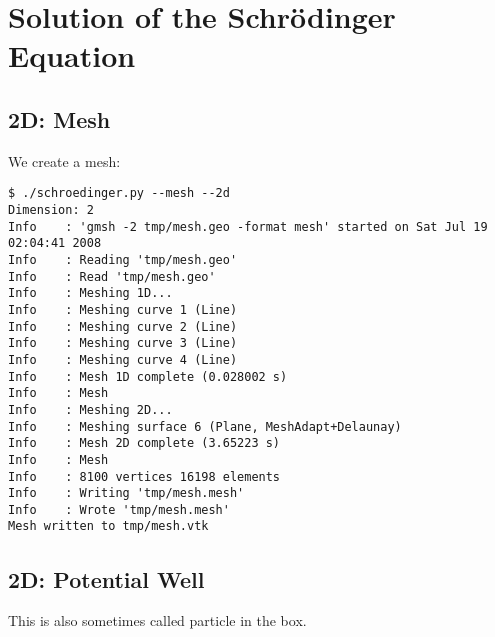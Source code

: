\section{Solution of the Schr\"odinger Equation}

\subsection{2D: Mesh}

We create a mesh:

\begin{lstlisting}
$ ./schroedinger.py --mesh --2d
Dimension: 2
Info    : 'gmsh -2 tmp/mesh.geo -format mesh' started on Sat Jul 19 02:04:41 2008
Info    : Reading 'tmp/mesh.geo'
Info    : Read 'tmp/mesh.geo'
Info    : Meshing 1D...
Info    : Meshing curve 1 (Line)
Info    : Meshing curve 2 (Line)
Info    : Meshing curve 3 (Line)
Info    : Meshing curve 4 (Line)
Info    : Mesh 1D complete (0.028002 s)
Info    : Mesh
Info    : Meshing 2D...
Info    : Meshing surface 6 (Plane, MeshAdapt+Delaunay)
Info    : Mesh 2D complete (3.65223 s)
Info    : Mesh
Info    : 8100 vertices 16198 elements
Info    : Writing 'tmp/mesh.mesh'
Info    : Wrote 'tmp/mesh.mesh'
Mesh written to tmp/mesh.vtk
\end{lstlisting}

\subsection{2D: Potential Well}

This is also sometimes called particle in the box.

